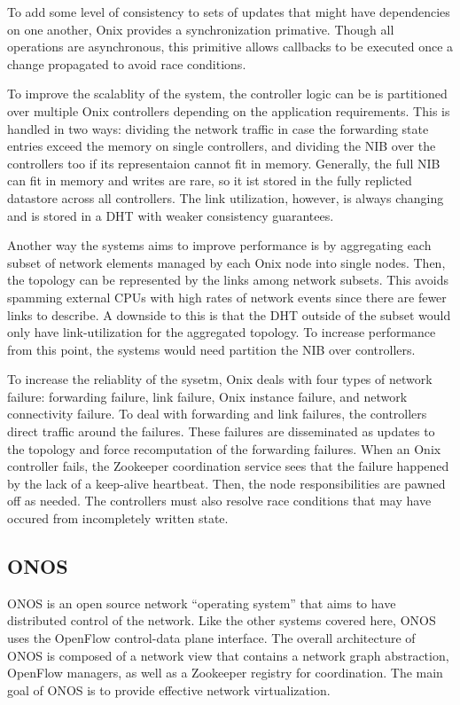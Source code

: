 \documentclass[letterpaper,twocolumn,10pt]{article}
\begin{document}
To add some level of consistency to sets of updates that might have dependencies on one another, Onix provides a synchronization primative. Though all operations are asynchronous, this primitive allows callbacks to be executed once a change propagated to avoid race conditions.

To improve the scalablity of the system, the controller logic can be is partitioned over multiple Onix controllers depending on the application requirements. This is handled in two ways: dividing the network traffic in case the forwarding state entries exceed the memory on single controllers, and dividing the NIB over the controllers too if its representaion cannot fit in memory. Generally, the full NIB can fit in memory and writes are rare, so it ist stored in the fully replicted datastore across all controllers. The link utilization, however, is always changing and is stored in a DHT with weaker consistency guarantees.

Another way the systems aims to improve performance is by aggregating each subset of network elements managed by each Onix node into single nodes. Then, the topology can be represented by the links among network subsets. This avoids spamming external CPUs with high rates of network events since there are fewer links to describe. A downside to this is that the DHT outside of the subset would only have link-utilization for the aggregated topology. To increase performance from this point, the systems would need partition the NIB over controllers.

To increase the reliablity of the sysetm, Onix deals with four types of network failure: forwarding failure, link failure, Onix instance failure, and network connectivity failure. To deal with forwarding and link failures, the controllers direct traffic around the failures. These failures are disseminated as updates to the topology and force recomputation of the forwarding failures. When an Onix controller fails, the Zookeeper coordination service sees that the failure happened by the lack of a keep-alive heartbeat. Then, the node responsibilities are pawned off as needed. The controllers must also resolve race conditions that may have occured from incompletely written state.
    
\subsection{ONOS}

ONOS is an open source network ``operating system'' that aims to have distributed control of the network. Like the other systems covered here, ONOS uses the OpenFlow control-data plane interface. The overall architecture of ONOS is composed of a network view that contains a network graph abstraction, OpenFlow managers, as well as a Zookeeper registry for coordination. The main goal of ONOS is to provide effective network virtualization.\cite{berde2014onos}
\end{document}
